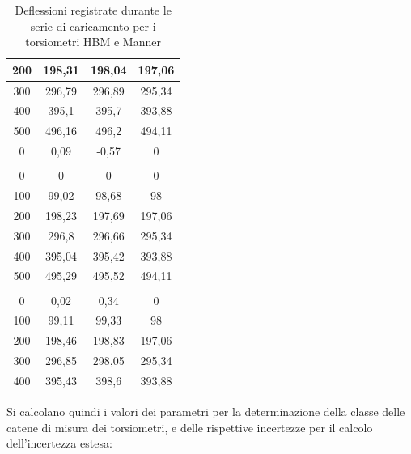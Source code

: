 \documentclass[a4paper, twoside]{article}
\begin{document}
\begin{table}[H]
{\begin{tabular}{|c|c|c|c|}
        \hline
        200 & 198,31 & 198,04 & 197,06 \\
        \hline
        300 & 296,79 & 296,89 & 295,34 \\
        \hline
        400 & 395,1 & 395,7 & 393,88 \\
        \hline
        500 & 496,16 & 496,2 & 494,11 \\
        \hline
        0 & 0,09 & -0,57 & 0 \\
        \hline
        \rowcolor{rowlight}
        \multicolumn{4}{|c|}{\textbf{Quarta serie}} \\
        \hline
        0 & 0 & 0 & 0 \\
        \hline
        100 & 99,02 & 98,68 & 98 \\
        \hline
        200 & 198,23 & 197,69 & 197,06 \\
        \hline
        300 & 296,8 & 296,66 & 295,34 \\
        \hline
        400 & 395,04 & 395,42 & 393,88 \\
        \hline
        500 & 495,29 & 495,52 & 494,11 \\
        \hline
        \rowcolor{rowlight}
        \multicolumn{4}{|c|}{\textbf{Quinta serie}} \\
        \hline
        0 & 0,02 & 0,34 & 0 \\
        \hline
        100 & 99,11 & 99,33 & 98 \\
        \hline
        200 & 198,46 & 198,83 & 197,06 \\
        \hline
        300 & 296,85 & 298,05 & 295,34 \\
        \hline
        400 & 395,43 & 398,6 & 393,88 \\
        \hline
    \end{tabular}%
    }
    \caption{Deflessioni registrate durante le serie di caricamento per i torsiometri HBM e Manner}
    \label{tab:deflessioni_taratura_renk}
\end{table}

Si calcolano quindi i valori dei parametri per la determinazione della classe delle catene di misura dei torsiometri, e delle rispettive incertezze per il calcolo dell'incertezza estesa:
\end{document}
